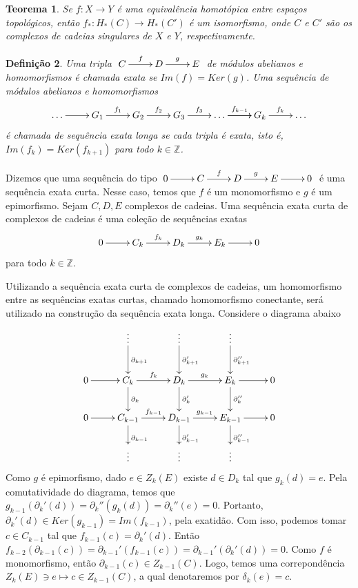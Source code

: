 \documentclass[12pt]{book}
\newtheorem{teorema}{Teorema}[section]
\newtheorem{definicao}[teorema]{Definição}
\newcommand{\bordo}[1]{\partial_{#1}}
\newcommand{\homologiaabrev}[2]{H_{#1}(#2)}
\newcommand{\inteiros}{\mathbb{Z}}
\newcommand{\kernelbordoabrev}[2]{Z_{#1}(#2)}
\begin{document}
	\begin{teorema}
		Se $f: X \to Y$ é uma equivalência homotópica entre espaços topológicos, então $f_{*}:\homologiaabrev{*}{C} \to \homologiaabrev{*}{C'}$ é um isomorfismo, onde $C$ e $C'$ são os complexos de cadeias singulares de $X$ e $Y$, respectivamente.
	\end{teorema}
	
	\begin{definicao}
		Uma tripla $\xymatrix{C\ar[r]^{f} & D\ar[r]^{g} & E }$ de módulos abelianos e homomorfismos é chamada exata se $Im(f) = Ker(g)$. Uma sequência de módulos abelianos e homomorfismos
		$$
		\xymatrix{\dots \ar[r]& G_{1}\ar[r]^{f_{1}} & G_{2}\ar[r]^{f_{2}} & G_{3}\ar[r]^{f_{3}} & \dots \ar[r]\ar[r]^{f_{k-1}} & G_{k}\ar[r]^{f_{k}} &\dots}
		$$
		é chamada de sequência exata longa se cada tripla é exata, isto é, $Im(f_{k}) = Ker(f_{k+1})$ para todo $k\in \inteiros$.
	\end{definicao}
	
	Dizemos que uma sequência do tipo $ \xymatrix{0 \ar[r] & C\ar[r]^{f} & D\ar[r]^{g} & E \ar[r]& 0}$ é uma sequência exata curta. Nesse caso, temos que $f$ é um monomorfismo e $g$ é um epimorfismo. Sejam $C, D, E$ complexos de cadeias. Uma sequência exata curta de complexos de cadeias é uma coleção de sequências exatas
	$$ 
	\xymatrix{0 \ar[r] & C_{k}\ar[r]^{f_{k}} & D_{k}\ar[r]^{g_{k}} & E_{k} \ar[r]& 0}
	$$
	para todo $k \in \inteiros$.
	
	Utilizando a sequência exata curta de complexos de cadeias, um homomorfismo entre as sequências exatas curtas, chamado homomorfismo conectante, será utilizado na construção da sequência exata longa. Considere o diagrama abaixo
	$$
	\xymatrix{
		 & \vdots \ar[d]^{\bordo{k+1}} & \vdots \ar[d]^{\bordo{k+1}'} & \vdots \ar[d]^{\bordo{k+1}''}& 
		\\
		0 \ar[r] & C_{k}\ar[d]^{\bordo{k}}\ar[r]^{f_{k}} & D_{k}\ar[d]^{\bordo{k}'}\ar[r]^{g_{k}} & E_{k} \ar[d]^{\bordo{k}''}\ar[r]& 0
		\\
		0 \ar[r] & C_{k-1}\ar[d]^{\bordo{k-1}}\ar[r]^{f_{k-1}} & D_{k-1}\ar[d]^{\bordo{k-1}'}\ar[r]^{g_{k-1}} & E_{k-1}\ar[d]^{\bordo{k-1}''} \ar[r]& 0
		\\
		 & \vdots & \vdots  & \vdots & 
	}
	$$
	Como $g$ é epimorfismo, dado $e \in \kernelbordoabrev{k}{E}$ existe $d \in D_{k}$ tal que $g_{k}(d) = e$. Pela comutatividade do diagrama, temos que $g_{k-1}(\bordo{k}'(d)) = \bordo{k}''(g_{k}(d)) = \bordo{k}''(e) = 0$. Portanto, $\bordo{k}'(d) \in Ker(g_{k-1}) = Im(f_{k-1})$, pela exatidão. Com isso, podemos tomar $c \in C_{k-1}$ tal que $f_{k-1}(c)=\bordo{k}'(d)$. Então $f_{k-2}(\bordo{k-1}(c)) = \bordo{k-1}'(f_{k-1}(c)) = \bordo{k-1}'(\bordo{k}'(d)) = 0$. Como $f$ é monomorfismo, então $\bordo{k-1}(c) \in \kernelbordoabrev{k-1}{C}$. Logo, temos uma correpondência $\kernelbordoabrev{k}{E} \ni e \mapsto c \in \kernelbordoabrev{k-1 }{C}$, a qual denotaremos por $\delta_{k}(e) = c$. 
	
\end{document}
